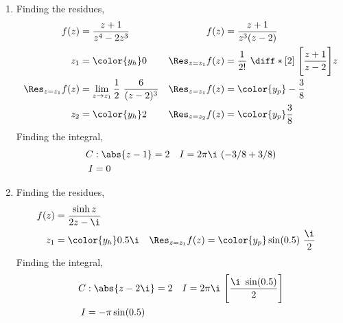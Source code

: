 \begin{enumerate}
    \item Finding the residues,
          \begin{align}
              f(z)                & = \frac{z + 1}{z^4 - 2z^3}         &
              f(z)                & = \frac{z+1}{z^3(z - 2)}             \\
              z_1                 & = \color{y_h} 0                    &
              \Res_{z = z_1} f(z) & = \frac{1}{2!}\ \diff*[2]{\ \Bigg[
              \frac{z+1}{z-2} \Bigg]}{z}                                 \\
              \Res_{z = z_1} f(z) & = \lim_{z \to z_1} \frac{1}{2}
              \ \frac{6}{(z-2)^3} &
              \Res_{z = z_1} f(z) & = \color{y_p} -\frac{3}{8}           \\
              z_2                 & = \color{y_h} 2                    &
              \Res_{z = z_2} f(z) & = \color{y_p} \frac{3}{8}
          \end{align}
          Finding the integral,
          \begin{align}
              C & : \abs{z - 1} = 2      &
              I & = 2\pi\i\ (-3/8 + 3/8)   \\
              I & = 0
          \end{align}

    \item Finding the residues,
          \begin{align}
              f(z)                & = \frac{\sinh z}{2z - \i}               \\
              z_1                 & = \color{y_h} 0.5\i                   &
              \Res_{z = z_1} f(z) & = \color{y_p} \sin(0.5)\ \frac{\i}{2}
          \end{align}
          Finding the integral,
          \begin{align}
              C & : \abs{z - 2\i} = 2                             &
              I & = 2\pi\i\ \Bigg[ \frac{\i\ \sin(0.5)}{2} \Bigg]   \\
              I & = -\pi\sin(0.5)
          \end{align}


\end{enumerate}
